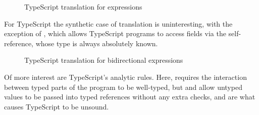 \documentclass[a4paper,USenglish]{tex/lipics-v2016}
\begin{document}
\begin{figure}[!h]
\begin{mathpar}




\end{mathpar}
\caption{TypeScript translation for expressions}
\label{fig:tstrans_exp}
\end{figure}

For TypeScript the synthetic case of translation is uninteresting, with the 
exception of , which allows TypeScript programs to access fields
via the self-reference, whose type is always absolutely known.

\begin{figure}[!h]
\begin{mathpar}


\end{mathpar}
\caption{TypeScript translation for bidirectional expressions}
\label{fig:tstrans_exp2}
\end{figure}

Of more interest are TypeScript's analytic rules. Here, 
requires the interaction between typed parts of the program to be well-typed,
but  and  allow untyped values to be passed
into typed references without any extra checks, and are what causes TypeScript
to be unsound.
\end{document}
